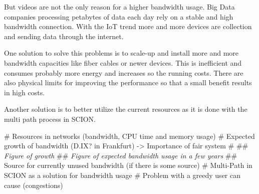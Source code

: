 \documentclass[thesis.tex]{subfiles}
\begin{document}
But videos are not the only reason for a higher bandwidth usage. Big Data companies processing petabytes of data each day rely on a stable and high bandwidth connection. With the IoT trend more and more devices are collection and sending data through the internet.


One solution to solve this problems is to scale-up and install more and more bandwidth capacities like fiber cables or newer devices. This is inefficient and consumes probably more energy and increases so the running costs. There are also physical limits for improving the performance so that a small benefit results in high costs.

Another solution is to better utilize the current resources as it is done with the multi path process in SCION. 
\begin{easylist}
    \MyListProperties
    # Resources in networks (bandwidth, CPU time and memory usage)
    # Expected growth of bandwidth (D.IX? in Frankfurt) -> Importance of fair system
    #
    ## \textit{Figure of growth}
    ## \textit{Figure of expected bandwidth usage in a few years}
    ## Source for currently unused bandwidth (if there is some source)
    # Multi-Path in SCION as a solution for bandwidth usage
    # Problem with a greedy user can cause (congestions)
\end{easylist}
\end{document}
